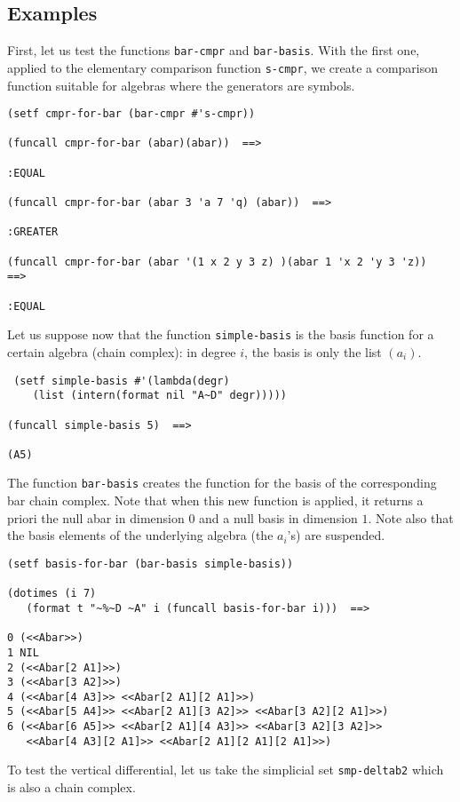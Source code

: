 \subsection* {Examples}

First, let us test the functions {\tt bar-cmpr} and {\tt bar-basis}. With the first one, applied
to the elementary comparison function {\tt s-cmpr}, we create a comparison function suitable
for algebras where the generators are symbols.

{\footnotesize\begin{verbatim}
(setf cmpr-for-bar (bar-cmpr #'s-cmpr))  

(funcall cmpr-for-bar (abar)(abar))  ==>

:EQUAL

(funcall cmpr-for-bar (abar 3 'a 7 'q) (abar))  ==>

:GREATER

(funcall cmpr-for-bar (abar '(1 x 2 y 3 z) )(abar 1 'x 2 'y 3 'z))  ==>

:EQUAL
\end{verbatim}}
Let us suppose now that the function {\tt simple-basis} is the basis function for a certain
algebra (chain complex): in degree $i$, the basis is only the list $(a_i)$.
{\footnotesize\begin{verbatim}
 (setf simple-basis #'(lambda(degr) 
    (list (intern(format nil "A~D" degr)))))

(funcall simple-basis 5)  ==>

(A5)
\end{verbatim}}
The function {\tt bar-basis} creates the function for the basis of the cor\-res\-pon\-ding bar chain complex. Note
that when this new  function is applied, it returns a priori the null abar in dimension $0$ 
and a null basis in dimension $1$. Note also that the basis elements 
of the underlying algebra (the $a_i$'s) are suspended.
{\footnotesize\begin{verbatim}
(setf basis-for-bar (bar-basis simple-basis))

(dotimes (i 7)
   (format t "~%~D ~A" i (funcall basis-for-bar i)))  ==>

0 (<<Abar>>)
1 NIL
2 (<<Abar[2 A1]>>)
3 (<<Abar[3 A2]>>)
4 (<<Abar[4 A3]>> <<Abar[2 A1][2 A1]>>)
5 (<<Abar[5 A4]>> <<Abar[2 A1][3 A2]>> <<Abar[3 A2][2 A1]>>)
6 (<<Abar[6 A5]>> <<Abar[2 A1][4 A3]>> <<Abar[3 A2][3 A2]>> 
   <<Abar[4 A3][2 A1]>> <<Abar[2 A1][2 A1][2 A1]>>)
\end{verbatim}}
To test the vertical differential, let us take the simplicial set  {\tt smp-deltab2} which is also a chain complex.

